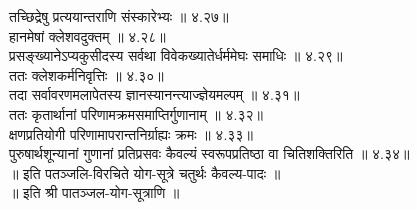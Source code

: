 \begin{multicols}{2}
\begin{flushleft}
तच्छिद्रेषु प्रत्ययान्तराणि संस्कारेभ्यः ॥ ४.२७॥\\
हानमेषां क्लेशवदुक्तम् ॥ ४.२८॥\\
प्रसङ्ख्यानेऽप्यकुसीदस्य सर्वथा विवेकख्यातेर्धर्ममेघः समाधिः ॥ ४.२९॥\\
ततः क्लेशकर्मनिवृत्तिः ॥ ४.३०॥\\
तदा सर्वावरणमलापेतस्य ज्ञानस्यानन्त्याज्ज्ञेयमल्पम् ॥ ४.३१॥\\
ततः कृतार्थानां परिणामक्रमसमाप्तिर्गुणानाम् ॥ ४.३२॥\\
क्षणप्रतियोगी परिणामापरान्तनिर्ग्राह्यः क्रमः ॥ ४.३३॥\\
पुरुषार्थशून्यानां गुणानां प्रतिप्रसवः कैवल्यं स्वरूपप्रतिष्ठा वा चितिशक्तिरिति ॥ ४.३४॥\\
॥ इति पतञ्जलि-विरचिते योग-सूत्रे चतुर्थः कैवल्य-पादः ॥\\
॥ इति श्री पातञ्जल-योग-सूत्राणि ॥\\
\end{flushleft}
\end{multicols}




